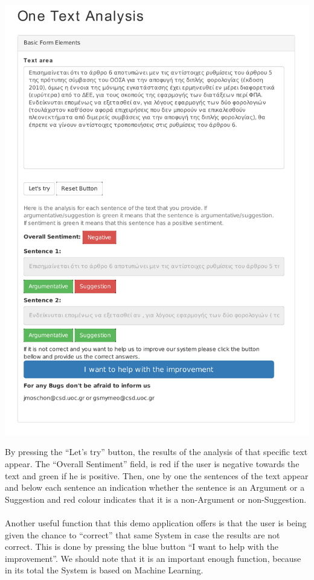 \includegraphics[width=0.9\linewidth]{figure/screens/screen2_vector.pdf}

By pressing the ``Let's try'' button, the results of the analysis of that specific text appear. The ``Overall Sentiment'' field, is red if the user is negative towards the text and green if he is positive. Then, one by one the sentences of the text appear and below each sentence  an indication whether the sentence is an Argument or a Suggestion and red colour indicates that it is a non-Argument or non-Suggestion.\\
\\
Another useful function that this demo application offers is that the user is being given the chance to ``correct'' that same System in case the results are not correct. This is done by pressing the blue button ``I want to help with the improvement''. We should note that it is an important enough function, because in its total the System is based on Machine Learning.\\
\\

